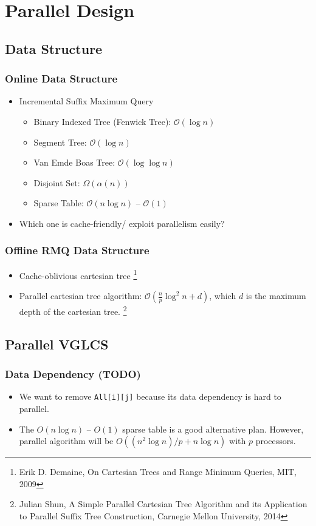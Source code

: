 \section{Parallel Design}

\subsection{Data Structure}
\begin{frame}
    \frametitle{Online Data Structure}
    \begin{itemize}
    \setlength\itemsep{1em}
    	\item Incremental Suffix Maximum Query
    		\begin{itemize}
    			\setlength\itemsep{1em}
    			\item Binary Indexed Tree (Fenwick Tree): $\mathcal{O}(\log n)$
    			\item Segment Tree: $\mathcal{O}(\log n)$
    			\item Van Emde Boas Tree: $\mathcal{O}(\log \log n)$
    			\item Disjoint Set: $\Omega(\alpha(n))$
    			\item Sparse Table: $\mathcal{O}(n \log n)$ -- $\mathcal{O}(1)$
    		\end{itemize}
    	\item Which one is cache-friendly/ exploit parallelism easily?
    \end{itemize}
\end{frame}

\begin{frame}
    \frametitle{Offline RMQ Data Structure}
    \begin{itemize}
    \setlength\itemsep{1em}
    	\item Cache-oblivious cartesian tree
    	\footnote{Erik D. Demaine, On Cartesian Trees and Range Minimum Queries, MIT, 2009}
    	\item Parallel cartesian tree algorithm:  $\mathcal{O}(\frac{n}{p} \log^2 n + d)$, 
    		which $d$ is the maximum depth of the cartesian tree.
    	\footnote{Julian Shun, A Simple Parallel Cartesian Tree Algorithm and its Application 
    		to Parallel Suffix Tree Construction, Carnegie Mellon University, 2014}
    \end{itemize}
\end{frame}

\subsection{Parallel VGLCS}
\begin{frame}
	\frametitle{Data Dependency (TODO)}
	\begin{itemize}
		\setlength\itemsep{1em}
		\item We want to remove \texttt{All[i][j]} because its data dependency 
			is hard to parallel.
		\item The $O(n \log n)$ -- $O(1)$ sparse table is a good alternative plan. However, parallel algorithm will be $O((n^2 \log n) / p + n \log n)$ with $p$ processors.
	\end{itemize}
\end{frame}

